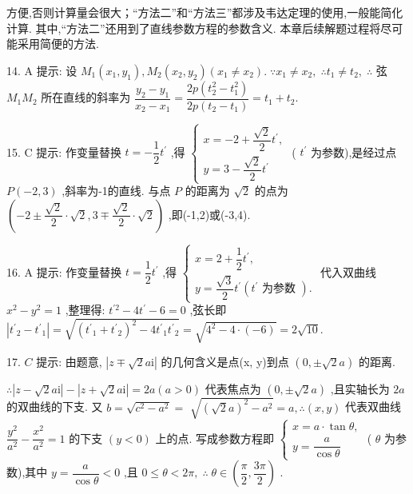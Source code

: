 方便,否则计算量会很大；“方法二”和“方法三”都涉及韦达定理的使用,一般能简化计算. 其中,“方法二”还用到了直线参数方程的参数含义. 本章后续解题过程将尽可能采用简便的方法.

14. A 提示: 设 ${M}_{1}\left( {{x}_{1},{y}_{1}}\right) ,{M}_{2}\left( {{x}_{2},{y}_{2}}\right) \left( {{x}_{1} \neq  {x}_{2}}\right) .\;\because {x}_{1} \neq  {x}_{2},\;\therefore {t}_{1} \neq  {t}_{2},\;\therefore$ 弦 ${M}_{1}{M}_{2}$ 所在直线的斜率为 $\dfrac{{y}_{2} - {y}_{1}}{{x}_{2} - {x}_{1}} = \dfrac{{2p}\left( {{t}_{2}^{2} - {t}_{1}^{2}}\right) }{{2p}\left( {{t}_{2} - {t}_{1}}\right) } = {t}_{1} + {t}_{2}.$

15. C 提示: 作变量替换 $t =  - \dfrac{1}{2}{t}^{\prime }$ ,得 $\left\{  \begin{array}{l} x =  - 2 + \dfrac{\sqrt{2}}{2}{t}^{\prime }, \\  y = 3 - \dfrac{\sqrt{2}}{2}{t}^{\prime } \end{array}\right.$ ( ${t}^{\prime }$ 为参数),是经过点 $P\left( {-2,3}\right)$ ,斜率为-1的直线. 与点 $P$ 的距离为 $\sqrt{2}$ 的点为 $\left( {-2 \pm  \dfrac{\sqrt{2}}{2} \cdot  \sqrt{2},3 \mp  \dfrac{\sqrt{2}}{2} \cdot  \sqrt{2}}\right)$ ,即(-1,2)或(-3,4).

16. A 提示: 作变量替换 $t = \dfrac{1}{2}{t}^{\prime }$ ,得 $\left\{  \begin{array}{l} x = 2 + \dfrac{1}{2}{t}^{\prime }, \\  y = \dfrac{\sqrt{3}}{2}{t}^{\prime }\left( {{t}^{\prime }\text{ 为参数 }}\right) . \end{array}\right.$ 代入双曲线 ${x}^{2} - {y}^{2} = 1$ ,整理得: ${t}^{\prime 2} - 4{t}^{\prime } - 6 = 0$ ,弦长即 $\left| {{t}^{\prime }{}_{2} - {t}^{\prime }{}_{1}}\right|  = \sqrt{{\left( {t}^{\prime }{}_{1} + {t}^{\prime }{}_{2}\right) }^{2} - 4{t}^{\prime }{}_{1}{t}^{\prime }{}_{2}} = \sqrt{{4}^{2} - 4 \cdot  \left( {-6}\right) } = 2\sqrt{10}.$

17. $C$ 提示: 由题意, $\left| {z \mp  \sqrt{2}a\mathrm{i}}\right|$ 的几何含义是点(x, y)到点 $\left( {0, \pm  \sqrt{2}a}\right)$ 的距离.

$\therefore \left| {z - \sqrt{2}a\mathrm{i}}\right|  - \left| {z + \sqrt{2}a\mathrm{i}}\right|  = {2a}\left( {a > 0}\right)$ 代表焦点为 $\left( {0, \pm  \sqrt{2}a}\right)$ ,且实轴长为 ${2a}$ 的双曲线的下支. 又 $b = \sqrt{{c}^{2} - {a}^{2}} =$  $\sqrt{{\left( \sqrt{2}a\right) }^{2} - {a}^{2}} = a,\therefore \left( {x,y}\right)$ 代表双曲线 $\dfrac{{y}^{2}}{{a}^{2}} - \dfrac{{x}^{2}}{{a}^{2}} = 1$ 的下支 $\left( {y < 0}\right)$ 上的点. 写成参数方程即 $\left\{  \begin{array}{l} x = a \cdot  \tan \theta , \\  y = \dfrac{a}{\cos \theta } \end{array}\right.$ ( $\theta$ 为参数),其中 $y = \dfrac{a}{\cos \theta } < 0$ ,且 $0 \leq  \theta  < {2\pi },\;\therefore \;\theta  \in  \left( {\dfrac{\pi }{2},\dfrac{3\pi }{2}}\right)$ .

